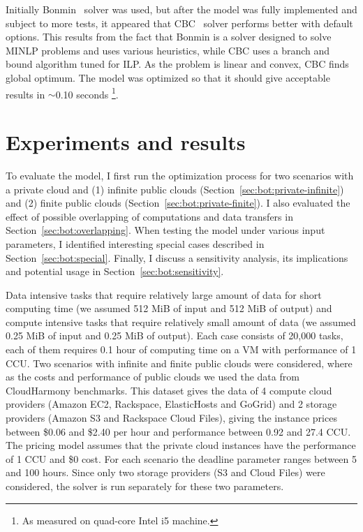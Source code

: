 {  Initially {Bonmin}~\cite{Bonami2008} solver was used, but after the model was fully implemented and subject to more tests, it appeared that CBC~\cite{cbc-solver} solver performs better with default options. This results from the fact that {Bonmin} is a solver designed to solve MINLP problems and uses various heuristics, while CBC uses a branch and bound algorithm tuned for ILP. As the problem is linear and convex, CBC finds global optimum. The model was optimized so that it should give acceptable results in $\sim$0.10 seconds \footnote{As measured on quad-core Intel i5 machine.}. 

\section{Experiments and results}
\label{sec:bot:results}
    
  To evaluate the model, I first run the optimization process for two scenarios with a private cloud and (1) infinite public clouds (Section~\ref{sec:bot:private-infinite}) and (2) finite public clouds (Section~\ref{sec:bot:private-finite}). I also evaluated the effect of possible overlapping of computations and data transfers in Section~\ref{sec:bot:overlapping}. When testing the model under various input parameters, I identified interesting special cases described in Section~\ref{sec:bot:special}. Finally, I discuss a sensitivity analysis, its implications and potential usage in Section~\ref{sec:bot:sensitivity}.
    
  Data intensive tasks that require relatively large amount of data for short computing time (we assumed 512 MiB of input and 512 MiB of output) and compute intensive tasks that require relatively small amount of data (we assumed 0.25 MiB of input and 0.25 MiB of output). Each case consists of 20,000 tasks, each of them requires 0.1 hour of computing time on a VM with performance of 1 CCU. Two scenarios with infinite and finite public clouds were considered, where as the costs and performance of public clouds we used the data from CloudHarmony benchmarks. This dataset gives the data of 4 compute cloud providers (Amazon EC2, Rackspace, ElasticHosts and GoGrid) and 2 storage providers (Amazon S3 and Rackspace Cloud Files), giving the instance prices between \$0.06 and \$2.40 per hour and performance between 0.92 and 27.4 CCU. The pricing model assumes that the private cloud instances have the performance of 1 CCU and \$0 cost.  For each scenario the deadline parameter ranges between 5 and 100 hours.  Since only two storage providers (S3 and Cloud Files) were considered, the solver is run separately for these two parameters.
    
}
